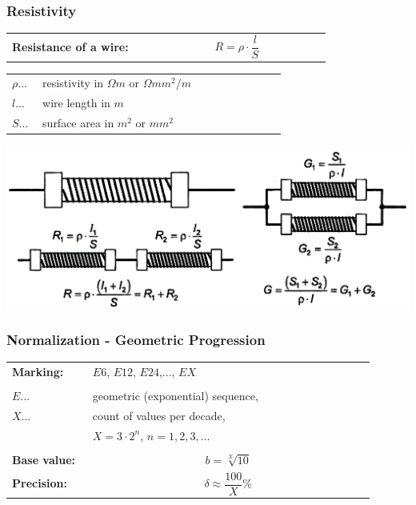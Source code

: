 \documentclass{beamer}
\begin{document}
	\begin{frame}
    \frametitle{Resistivity}
		\begin{center}
		\begin{tabular}{p{0.4\linewidth} p{0.5\linewidth}}
			\textbf{Resistance of a wire:} 					& $$R = \rho\cdot\frac{l}{S}$$\\
		\end{tabular}
		\begin{tabular}{p{0.1\linewidth} p{0.8\linewidth}}
			$\rho$...																& resistivity in $\Omega m$ or $\Omega mm^2/m$\\
			$l$...																	& wire length in $m$\\
			$S$...																	& surface area in $m^2$ or $mm^2$\\
		\end{tabular}
			\includegraphics[scale=0.25]{obr01_spojovaniR.png}
		\end{center}
  \end{frame}
	\begin{frame}
    \frametitle{Normalization - Geometric Progression}
		\begin{center}
		\begin{tabular}{p{0.2\linewidth} p{0.7\linewidth}}
			\textbf{Marking:} 					& $E6$, $E12$, $E24$,..., $EX$\\\\
			$E$...											& geometric (exponential) sequence,\\
			$X$...											& count of values per decade, \\
																	& $X = 3\cdot 2^n$, $n=1,2,3,...$\\\\
			\textbf{Base value:}				& $$b= \sqrt[X]{10}$$\\
			\textbf{Precision:}					& $$\delta\approx \frac{100}{X}\%$$
		\end{tabular}
		\end{center}
  \end{frame}
\end{document}
